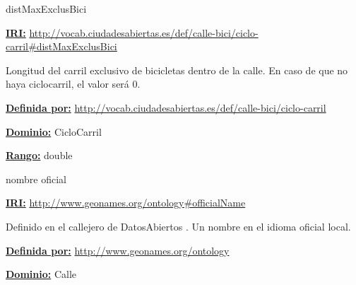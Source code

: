 \begin{mybox}{distMaxExclusBici}
\begin{flushleft}
\underline{\textbf{IRI:}}
\url{http://vocab.ciudadesabiertas.es/def/calle-bici/ciclo-carril#distMaxExclusBici}
\newline

Longitud del carril exclusivo de bicicletas dentro de la calle.
En caso de que no haya ciclocarril, el valor será 0.
\newline


\underline{\textbf{Definida por:}}
\url{http://vocab.ciudadesabiertas.es/def/calle-bici/ciclo-carril}
\newline

\underline{\textbf{Dominio:}}
	CicloCarril
\newline

\underline{\textbf{Rango:}}
	double
\newline

\end{flushleft}
\end{mybox}



\begin{mybox}{nombre oficial}
\begin{flushleft}
\underline{\textbf{IRI:}}
\url{http://www.geonames.org/ontology#officialName}
\newline

Definido en el callejero de DatosAbiertos \cite{ciudadesbiertas_callejero}.
Un nombre en el idioma oficial local.
\newline


\underline{\textbf{Definida por:}}
\url{http://www.geonames.org/ontology}
\newline

\underline{\textbf{Dominio:}}
	Calle
\newline


\end{flushleft}
\end{mybox}































